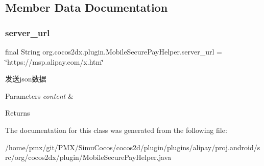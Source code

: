 \subsection{Member Data Documentation}
\mbox{\label{classorg_1_1cocos2dx_1_1plugin_1_1MobileSecurePayHelper_af06c96d6c405c8d71cc957488fa673ae}} 
\subsubsection{\texorpdfstring{server\+\_\+url}{server\_url}}
{\footnotesize\ttfamily final String org.\+cocos2dx.\+plugin.\+Mobile\+Secure\+Pay\+Helper.\+server\+\_\+url = \char`\"{}https\+://msp.\+alipay.\+com/x.\+htm\char`\"{}\hspace{0.3cm}{\ttfamily [static]}}

发送json数据


\begin{DoxyParams}{Parameters}
{\em content} & \\
\hline
\end{DoxyParams}
\begin{DoxyReturn}{Returns}

\end{DoxyReturn}


The documentation for this class was generated from the following file\+:\begin{DoxyCompactItemize}
\item 
/home/pmx/git/\+P\+M\+X/\+Simu\+Cocos/cocos2d/plugin/plugins/alipay/proj.\+android/src/org/cocos2dx/plugin/Mobile\+Secure\+Pay\+Helper.\+java\end{DoxyCompactItemize}
